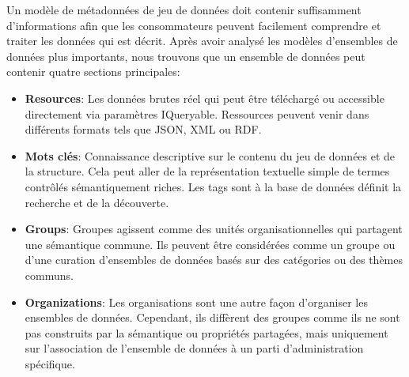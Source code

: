 \documentclass[a4paper,11pt,twoside]{ThesisStyle}
\begin{document}
Un modèle de métadonnées de jeu de données doit contenir suffisamment d'informations afin que les consommateurs peuvent facilement comprendre et traiter les données qui est décrit. Après avoir analysé les modèles d'ensembles de données plus importants, nous trouvons que un ensemble de données peut contenir quatre sections principales:
\begin{itemize}
  \item \textbf{Resources}: Les données brutes réel qui peut être téléchargé ou accessible directement via paramètres IQueryable. Ressources peuvent venir dans différents formats tels que JSON, XML ou RDF.
  \item \textbf{Mots clés}: Connaissance descriptive sur le contenu du jeu de données et de la structure. Cela peut aller de la représentation textuelle simple de termes contrôlés sémantiquement riches. Les tags sont à la base de données définit la recherche et de la découverte.
  \item \textbf{Groups}: Groupes agissent comme des unités organisationnelles qui partagent une sémantique commune. Ils peuvent être considérées comme un groupe ou d'une curation d'ensembles de données basés sur des catégories ou des thèmes communs.
  \item \textbf{Organizations}: Les organisations sont une autre façon d'organiser les ensembles de données. Cependant, ils diffèrent des groupes comme ils ne sont pas construits par la sémantique ou propriétés partagées, mais uniquement sur l'association de l'ensemble de données à un parti d'administration spécifique.
\end{itemize}
\end{document}
